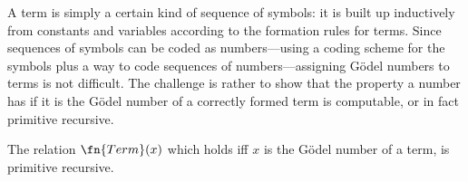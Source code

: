 \documentclass[../../include/open-logic-section]{subfiles}
\begin{document}

\begin{explain}
A term is simply a certain kind of sequence of symbols: it is built up
inductively from constants and variables according to the formation
rules for terms.  Since sequences of symbols can be coded as
numbers---using a coding scheme for the symbols plus a way to code
sequences of numbers---assigning G\"odel numbers to terms is not
difficult.  The challenge is rather to show that the property a number
has if it is the G\"odel number of a correctly formed term is
computable, or in fact primitive recursive.
\end{explain}

\begin{prop}
The relation $\fn{Term}(x)$ which holds iff $x$ is the G\"odel number
of a term, is primitive recursive.
\end{prop}
\end{document}
